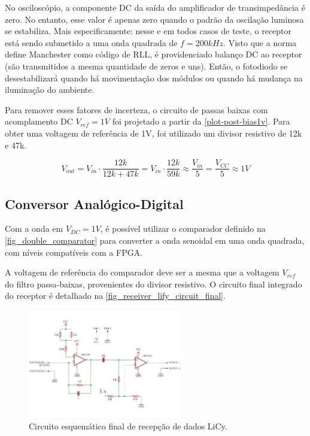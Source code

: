 	No osciloscópio, a componente DC da saída do amplificador de transimpedância é zero. No entanto, esse valor é apenas zero quando o padrão da oscilação luminosa se estabiliza. Mais especificamente: nesse e em todos casos de teste, o receptor está sendo submetido a uma onda quadrada de $f = 200kHz$. Visto que a norma define Manchester como código de RLL, é providenciado balanço DC ao receptor (são transmitidos a mesma quantidade de zeros e uns). Então, o fotodiodo se desestabilizará quando há movimentação dos módulos ou quando há mudança na iluminação do ambiente.

	Para remover esses fatores de incerteza, o circuito de passas baixas com acomplamento DC $V_{ref} = 1V$ foi projetado a partir da \autoref{plot-post-bias1v}. Para obter uma voltagem de referência de 1V, foi utilizado um divisor resistivo de 12k e 47k.

	\begin{equation}
	V_{out} = V_{in} \cdot \frac{12k}{12k + 47k} = V_{in} \cdot \frac{12k}{59k} \approx \frac{V_{in}}{5} = \frac{V_{CC}}{5} \approx 1V
	\end{equation}

	\subsection{Conversor Analógico-Digital}

	Com a onda em $V_{DC} = 1V$, é possível utilizar o comparador definido na \autoref{fig_double_comparator} para converter a onda senoidal em uma onda quadrada, com níveis compatíveis com a FPGA.

	A voltagem de referência do comparador deve ser a mesma que a voltagem $V_{ref}$ do filtro passa-baixas, provenientes do divisor resistivo. O circuito final integrado do receptor é detalhado na \autoref{fig_receiver_lify_circuit_final}.

	\begin{figure}[h]
		\caption{\label{fig_receiver_lify_circuit_final}Circuito esquemático final de recepção de dados LiCy.}
		\centering
		\includegraphics[width=0.6\textwidth, trim={0cm 1cm 0cm 1cm}, clip]{circuits/receiver_lify_final.pdf}
	\end{figure}

